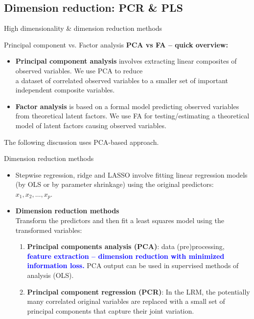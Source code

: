 \documentclass{beamer}
\begin{document}
\subsection{Dimension reduction: PCR \& PLS}
\begin{frame}{High dimensionality \& dimension reduction methods}
\end{frame}
\begin{frame}{Principal component vs. Factor analysis}
\textbf{PCA vs FA -- quick overview:}\\
\medskip
\begin{itemize}
\item \textbf{Principal component analysis} involves extracting linear composites of observed variables. We use PCA to reduce \\a dataset of correlated observed variables to a smaller set of important independent composite variables.
\bigskip
\item \textbf{Factor analysis} is based on a formal model predicting observed variables from theoretical latent factors. We use FA for testing/estimating a theoretical model of latent factors causing observed variables.
\end{itemize}
\bigskip
The following discussion uses PCA-based approach.
\end{frame}
\begin{frame}{Dimension reduction methods}
\begin{itemize}
\item Stepwise regression, ridge and LASSO involve fitting linear regression models (by OLS or by parameter shrinkage) using the original predictors: $x_1, x_2, \dots , x_p$.
\medskip
\item \textbf{Dimension reduction methods}\\ \medskip Transform the
predictors and then fit a least squares model using the
transformed variables:
\begin{enumerate}
\bigskip
\item \textbf{Principal components analysis (PCA)}: data (pre)processing, \textcolor{blue}{\textbf{feature extraction -- dimension reduction with minimized information loss.}} PCA output can be used in supervised methods of analysis (OLS).
\bigskip
\item \textbf{Principal component regression (PCR)}:  In the LRM, the potentially many correlated original variables are replaced with a small set of principal components that capture their joint variation.
\end{enumerate}
\end{itemize}
\end{frame}
\end{document}
